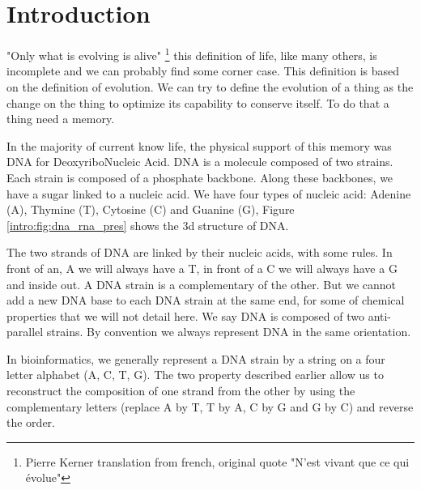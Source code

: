\documentclass[./main.tex]{subfiles}
\begin{document}
\chapter{Introduction}\label{chapter:introduction}

"Only what is evolving is alive" \footnote{Pierre Kerner translation from french, original quote "N'est vivant que ce qui évolue"} this definition of life, like many others, is incomplete and we can probably find some corner case. This definition is based on the definition of evolution. We can try to define the evolution of a thing as the change on the thing to optimize its capability to conserve itself. To do that a thing need a memory.

In the majority of current know life, the physical support of this memory was DNA for DeoxyriboNucleic Acid. DNA is a molecule composed of two strains. Each strain is composed of a phosphate backbone. Along these backbones, we have a sugar linked to a nucleic acid. We have four types of nucleic acid: Adenine (A), Thymine (T), Cytosine (C) and Guanine (G), Figure \ref{intro:fig:dna_rna_pres} shows the 3d structure of DNA.

The two strands of DNA are linked by their nucleic acids, with some rules. In front of an, A we will always have a T, in front of a C we will always have a G and inside out. A DNA strain is a complementary of the other. But we cannot add a new DNA base to each DNA strain at the same end, for some of chemical properties that we will not detail here. We say DNA is composed of two anti-parallel strains. By convention we always represent DNA in the same orientation.

In bioinformatics, we generally represent a DNA strain by a string on a four letter alphabet (A, C, T, G). The two property described earlier allow us to reconstruct the composition of one strand from the other by using the complementary letters (replace A by T, T by A, C by G and G by C) and reverse the order.%
\end{document}
